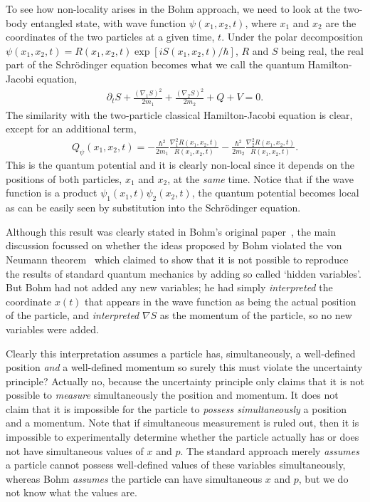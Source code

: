 \documentclass[12pt]{article}
\begin{document}
To see how non-locality arises in the Bohm approach, we need to look at the two-body entangled state, with wave function $\psi(x_1, x_2, t)$, where $x_1$ and $x_2$ are the coordinates of the two particles at a given time, $t$.  Under the polar decomposition  $\psi(x_1, x_2, t)= R(x_1, x_2, t)\exp[iS(x_1, x_2, t)/\hbar]$, $R$ and $S$ being real, the real part of the Schr\"{o}dinger equation becomes what we call the quantum Hamilton-Jacobi equation,
\begin{eqnarray}
\partial_t S+\frac{(\nabla_1S)^2}{2m_1}+\frac{(\nabla_{2} S)^2}{2m_2} + Q+V=0.	\label{eq:2body}
\end{eqnarray}
The similarity with the two-particle classical Hamilton-Jacobi equation is clear, except for an additional term,
\begin{eqnarray}
Q_\psi(x_1, x_2, t)=-\frac{\hbar^2}{2m_1}\frac{\nabla_1^2R(x_1,x_2,t)}{R(x_1,x_2,t)}-\frac{\hbar^2}{2m_2}\frac{\nabla_2^2R(x_1,x_2,t)}{R(x_1,x_2,t)}.	\label{eq:QPE}
\end{eqnarray}
This is the quantum potential and it is clearly non-local since it depends on the positions of both particles, $x_1$ and $x_2$, at the {\em same} time.  Notice that if the wave function is a product $\psi_1(x_1,t)\psi_2(x_2,t)$, the quantum potential becomes local as can be easily seen by substitution into the Schr\"{o}dinger equation.


Although this result was clearly stated in Bohm's original paper~\cite{db52}, the main discussion focussed on whether the ideas proposed by Bohm violated the von Neumann theorem~\cite{vn55} 
which claimed to show that  it is not possible to reproduce the results of standard quantum mechanics by adding so called `hidden variables'.  But Bohm had not added any new variables;  he had simply {\em interpreted} the coordinate $x(t)$ that appears in the wave function as being the actual position of the particle,  and {\em interpreted} $\nabla S$ as the momentum of the particle, so   no new variables were added.   

Clearly this interpretation assumes a particle has, simultaneously, a well-defined position {\em and} a well-defined momentum so  surely this must violate the uncertainty principle?  Actually no, because the uncertainty principle only claims that it is not possible to {\em measure} simultaneously the position and momentum.  It does not claim that it is  impossible for the particle to {\em possess simultaneously} a position and a momentum.  Note that if simultaneous measurement is ruled out, then it is impossible to experimentally determine whether the particle actually has or does not have simultaneous values of $x$ and $p$.  The standard approach merely {\em assumes} a particle cannot possess well-defined values of these variables simultaneously, whereas Bohm {\em assumes} the particle can have simultaneous $x$ and $p$, but we do not know what the values are.
\end{document}
